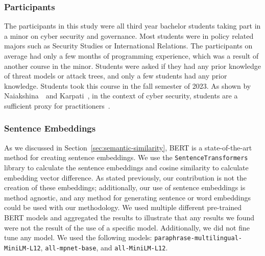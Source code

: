 \subsubsection{Participants}
The participants in this study were all third year bachelor students taking part in a minor on cyber security and governance. Most students were in policy related majors such as Security Studies or International Relations. The participants on average had only a few months of programming experience, which was a result of another course in the minor. Students were asked if they had any prior knowledge of threat models or attack trees, and only a few students had any prior knowledge. Students took this course in the fall semester of 2023. As shown by Naiakshina~\etal\ and Karpati~\etal, in the context of cyber security, students are a sufficient proxy for practitioners~\cite{karpatiComparingAttackTrees2014, naiakshinaConductingSecurityDeveloper2020}.







\subsubsection{Sentence Embeddings}
\label{ssec:method-embeddings}

As we discussed in Section~\ref{sec:semantic-similarity}, BERT is a state-of-the-art method for creating sentence embeddings. We use the \texttt{SentenceTransformers} library to calculate the sentence embeddings and cosine similarity to calculate embedding vector difference. As stated previously, our contribution is not the creation of these embeddings; additionally, our use of sentence embeddings is method agnostic, and any method for generating sentence or word embeddings could be used with our methodology. We used multiple different pre-trained BERT models and aggregated the results to illustrate that any results we found were not the result of the use of a specific model. Additionally, we did not fine tune any model. We used the following models: \texttt{paraphrase-multilingual-MiniLM-L12}, \texttt{all-mpnet-base}, and \texttt{all-MiniLM-L12}.

